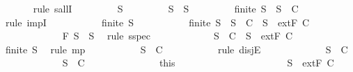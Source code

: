 \begin{isabellebody}
\ \ \ \ \ \isamarkupfalse%
\ {\isacharparenleft}rule\ sallI{\isacharparenright}\isanewline
\ \ \ \ \ \ \ \isamarkupfalse%
\ S{\isacharprime}\isanewline
\ \ \ \ \ \ \ \isamarkupfalse%
\ {\isachardoublequoteopen}S{\isacharprime}\ {\isasymsubseteq}\ S{\isachardoublequoteclose}\isanewline
\ \ \ \ \ \ \ \isamarkupfalse%
\ {\isachardoublequoteopen}finite\ S{\isacharprime}\ {\isasymlongrightarrow}\ S{\isacharprime}\ {\isasymin}\ C{\isachardoublequoteclose}\isanewline
\ \ \ \ \ \ \ \isamarkupfalse%
\ {\isacharparenleft}rule\ impI{\isacharparenright}\isanewline
\ \ \ \ \ \ \ \ \ \isamarkupfalse%
\ {\isachardoublequoteopen}finite\ S{\isacharprime}{\isachardoublequoteclose}\isanewline
\ \ \ \ \ \ \ \ \ \isamarkupfalse%
\ {\isachardoublequoteopen}finite\ S{\isacharprime}\ {\isasymlongrightarrow}\ S{\isacharprime}\ {\isasymin}\ C\ {\isasymor}\ S{\isacharprime}\ {\isasymin}\ {\isacharparenleft}extF\ C{\isacharparenright}{\isachardoublequoteclose}\ \isanewline
\ \ \ \ \ \ \ \ \ \ \ \isamarkupfalse%
\ F\ {\isacartoucheopen}S{\isacharprime}\ {\isasymsubseteq}\ S{\isacartoucheclose}\ \isamarkupfalse%
\ {\isacharparenleft}rule\ sspec{\isacharparenright}\isanewline
\ \ \ \ \ \ \ \ \ \isamarkupfalse%
\ \isamarkupfalse%
\ {\isachardoublequoteopen}S{\isacharprime}\ {\isasymin}\ C\ {\isasymor}\ S{\isacharprime}\ {\isasymin}\ {\isacharparenleft}extF\ C{\isacharparenright}{\isachardoublequoteclose}\isanewline
\ \ \ \ \ \ \ \ \ \ \ \isamarkupfalse%
\ {\isacartoucheopen}finite\ S{\isacharprime}{\isacartoucheclose}\ \isamarkupfalse%
\ {\isacharparenleft}rule\ mp{\isacharparenright}\isanewline
\ \ \ \ \ \ \ \ \ \isamarkupfalse%
\ {\isachardoublequoteopen}S{\isacharprime}\ {\isasymin}\ C{\isachardoublequoteclose}\isanewline
\ \ \ \ \ \ \ \ \ \isamarkupfalse%
\ {\isacharparenleft}rule\ disjE{\isacharparenright}\isanewline
\ \ \ \ \ \ \ \ \ \ \ \isamarkupfalse%
\ {\isachardoublequoteopen}S{\isacharprime}\ {\isasymin}\ C{\isachardoublequoteclose}\isanewline
\ \ \ \ \ \ \ \ \ \ \ \isamarkupfalse%
\ {\isachardoublequoteopen}S{\isacharprime}\ {\isasymin}\ C{\isachardoublequoteclose}\isanewline
\ \ \ \ \ \ \ \ \ \ \ \ \ \isamarkupfalse%
\ this\isanewline
\ \ \ \ \ \ \ \ \ \isamarkupfalse%
\isanewline
\ \ \ \ \ \ \ \ \ \ \ \isamarkupfalse%
\ {\isachardoublequoteopen}S{\isacharprime}\ {\isasymin}\ {\isacharparenleft}extF\ C{\isacharparenright}{\isachardoublequoteclose}\isanewline

\end{isabellebody}
